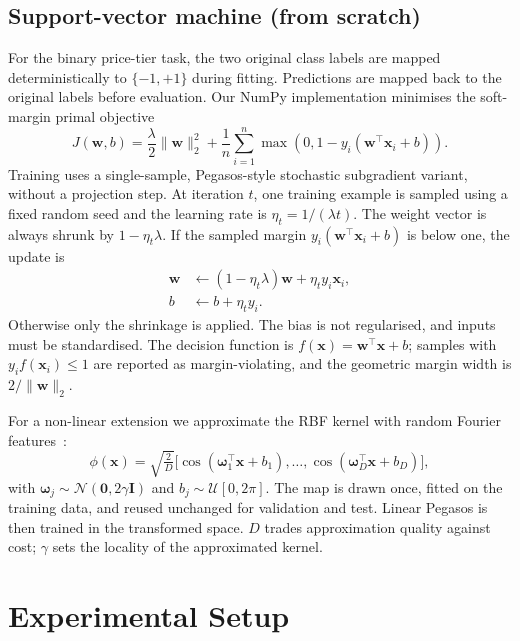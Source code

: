 \documentclass[10pt,twocolumn,a4paper]{article}
\begin{document}
\subsection{Support-vector machine (from scratch)}
For the binary price-tier task, the two original class labels are mapped
deterministically to $\{-1,+1\}$ during fitting. Predictions are mapped
back to the original labels before evaluation. Our NumPy implementation
minimises the soft-margin primal objective
\begin{equation}
  J(\mathbf{w},b)=
  \frac{\lambda}{2}\lVert\mathbf{w}\rVert_2^2+
  \frac{1}{n}\sum_{i=1}^{n}
  \max\!\left(0,1-y_i(\mathbf{w}^{\top}\mathbf{x}_i+b)\right).
\end{equation}
Training uses a single-sample, Pegasos-style stochastic subgradient variant,
without a projection step. At iteration $t$, one training example is sampled
using a fixed random seed and the learning rate is
$\eta_t=1/(\lambda t)$.
The weight vector is always shrunk by $1-\eta_t\lambda$. If the sampled
margin $y_i(\mathbf{w}^{\top}\mathbf{x}_i+b)$ is below one, the update is
\begin{align}
  \mathbf{w} &\leftarrow
  (1-\eta_t\lambda)\mathbf{w}+\eta_t y_i\mathbf{x}_i,\\
  b &\leftarrow b+\eta_t y_i.
\end{align}
Otherwise only the shrinkage is applied. The bias is not regularised, and
inputs must be standardised. The decision function is
$f(\mathbf{x})=\mathbf{w}^{\top}\mathbf{x}+b$; samples with
$y_i f(\mathbf{x}_i)\leq 1$ are reported as margin-violating, and the
geometric margin width is $2/\lVert\mathbf{w}\rVert_2$.

For a non-linear extension we approximate the RBF kernel with random
Fourier features~\cite{rahimi2007}:
\begin{equation}
  \phi(\mathbf{x})=
  \sqrt{\tfrac{2}{D}}
  \bigl[\cos(\boldsymbol{\omega}_1^{\top}\mathbf{x}+b_1),\ldots,
  \cos(\boldsymbol{\omega}_D^{\top}\mathbf{x}+b_D)\bigr],
\end{equation}
with $\boldsymbol{\omega}_j\sim\mathcal{N}(\mathbf{0},2\gamma\mathbf{I})$ and
$b_j\sim\mathcal{U}[0,2\pi]$. The map is drawn once, fitted on the
training data, and reused unchanged for validation and test. Linear Pegasos is
then trained in the transformed space. $D$ trades approximation quality
against cost; $\gamma$ sets the locality of the approximated kernel.

\section{Experimental Setup}
\end{document}
